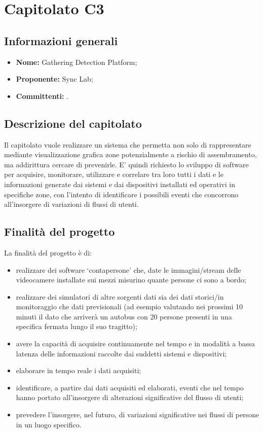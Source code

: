\section{Capitolato C3}

\subsection{Informazioni generali}
\begin{itemize}
\item \textbf{Nome:} Gathering Detection Platform;
\item \textbf{Proponente:} Sync Lab;
\item \textbf{Committenti:} \committenti{}.
\end{itemize}

\subsection{Descrizione del capitolato}
Il capitolato vuole realizzare un sistema che permetta non solo di rappresentare mediante visualizzazione grafica zone potenzialmente a rischio di assembramento, ma addirittura cercare di prevenirle. E' quindi richiesto lo sviluppo di software per acquisire, monitorare, utilizzare e correlare tra loro tutti i dati e le informazioni generate dai sistemi e dai dispositivi installati ed operativi in specifiche zone, con l'intento di identificare i possibili eventi che concorrono all'insorgere di variazioni di flussi di utenti. 

\subsection{Finalità del progetto}
La finalità del progetto è di:
\begin{itemize}
\item realizzare dei software ‘contapersone’ che, date le immagini/stream delle videocamere installate sui mezzi misurino quante persone ci sono a bordo;
\item realizzare dei simulatori di altre sorgenti dati sia dei dati storici/in monitoraggio che dati previsionali
(ad esempio valutando nei prossimi 10 minuti il dato che arriverà un autobus con 20 persone presenti
in una specifica fermata lungo il suo tragitto);
\item avere la capacità di acquisire continuamente nel tempo e in modalità a bassa latenza delle informazioni
raccolte dai suddetti sistemi e dispositivi;
\item elaborare in tempo reale i dati acquisiti;
\item identificare, a partire dai dati acquisiti ed elaborati, eventi che nel tempo hanno portato all'insorgere di alterazioni significative del flusso di utenti;
\item prevedere l'insorgere, nel futuro, di variazioni significative nei flussi di persone in un luogo specifico.
\end{itemize}

